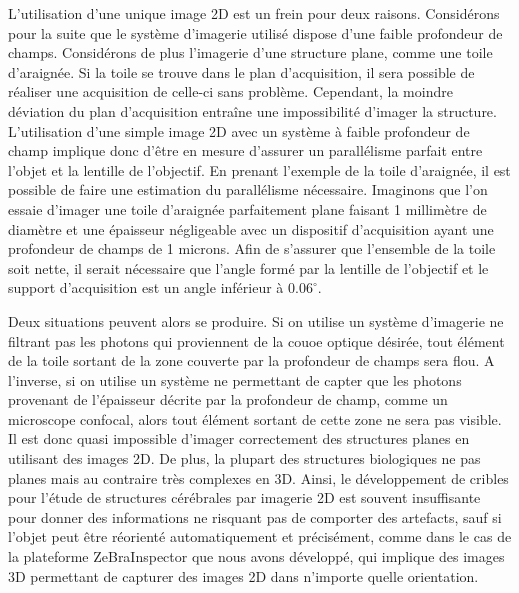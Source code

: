 \documentclass[\main/main.tex]{subfiles}
\begin{document}
%
L'utilisation d'une unique image 2D est un frein pour deux raisons.
%
Considérons pour la suite que le système d'imagerie utilisé dispose d'une faible profondeur de champs.
%
Considérons de plus l'imagerie d'une structure plane, comme une toile d'araignée.
%
Si la toile se trouve dans le plan d'acquisition, il sera possible de réaliser une acquisition de celle-ci sans problème.
%
Cependant, la moindre déviation du plan d'acquisition entraîne une impossibilité d'imager la structure.
%
L'utilisation d'une simple image 2D avec un système à faible profondeur de champ implique donc d'être en mesure d'assurer un parallélisme parfait entre l'objet et la lentille de l'objectif.
%
En prenant l'exemple de la toile d'araignée, il est possible de faire une estimation du parallélisme nécessaire.
%
Imaginons que l'on essaie d'imager une toile d'araignée parfaitement plane
faisant 1 millimètre de diamètre et une épaisseur négligeable
avec un dispositif d'acquisition ayant une profondeur de champs de 1 microns.
%
Afin de s'assurer que l'ensemble de la toile soit nette, il serait nécessaire que l'angle formé par la lentille de l'objectif et le support d'acquisition est un angle inférieur à $0.06^{\circ}$.

Deux situations peuvent alors se produire.
%
Si on utilise un système d'imagerie ne filtrant pas les photons qui proviennent de la couoe optique désirée, tout élément de la toile sortant de la zone couverte par la profondeur de champs sera flou.
%
A l'inverse, si on utilise un système ne permettant de capter que les photons provenant de l'épaisseur décrite par la profondeur de champ, comme un microscope confocal, alors tout élément sortant de cette zone ne sera pas visible.
%
Il est donc quasi impossible d'imager correctement des structures planes en utilisant des images 2D.
%
De plus, la plupart des structures biologiques ne  pas planes mais au contraire très complexes en 3D.
%
Ainsi, le développement de cribles pour l'étude de structures cérébrales par imagerie 2D est souvent insuffisante pour donner des informations ne risquant pas de comporter des artefacts, sauf si l'objet peut être réorienté automatiquement et précisément, comme dans le cas de la plateforme ZeBraInspector que nous avons développé, qui implique des images 3D permettant de capturer des images 2D dans n'importe quelle orientation.
%
\end{document}
